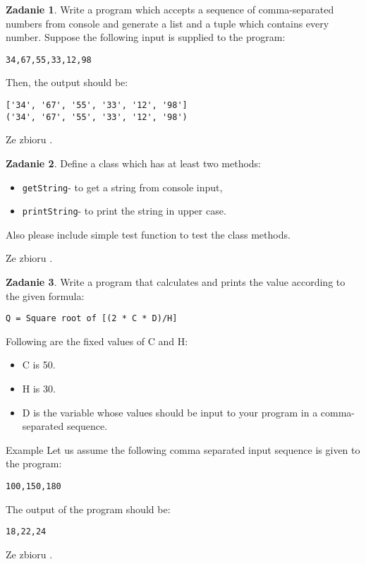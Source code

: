 \documentclass[11pt]{article}
\theoremstyle{definition}
\newtheorem{zadanie}{Zadanie}
\newcommand{\fromA}{\small Ze zbioru \cite{python100}.}
\begin{document}
\begin{zadanie}
Write a program which accepts a sequence of comma-separated numbers from console and generate a list and a tuple which contains every number.
Suppose the following input is supplied to the program:
\begin{verbatim}
34,67,55,33,12,98
\end{verbatim}
Then, the output should be:
\begin{verbatim}
['34', '67', '55', '33', '12', '98']
('34', '67', '55', '33', '12', '98')
\end{verbatim}

\fromA
\end{zadanie}

\begin{zadanie}
Define a class which has at least two methods:
\begin{itemize}
\item\texttt{getString}- to get a string from console input,
\item\texttt{printString}- to print the string in upper case.
\end{itemize}
Also please include simple test function to test the class methods.

\fromA
\end{zadanie}

\begin{zadanie}
Write a program that calculates and prints the value according to the given formula:
\begin{verbatim}
Q = Square root of [(2 * C * D)/H]
\end{verbatim}
Following are the fixed values of C and H:
\begin{itemize}
\item C is 50. 
\item H is 30.
\item D is the variable whose values should be input to your program in a comma-separated sequence.
\end{itemize}
Example
Let us assume the following comma separated input sequence is given to the program:
\begin{verbatim}
100,150,180
\end{verbatim}
The output of the program should be:
\begin{verbatim}
18,22,24
\end{verbatim}

\fromA
\end{zadanie}
\end{document}
